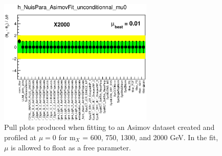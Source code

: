 \begin{figure}[hb]
\begin{center}
  \includegraphics[height=60mm]{figures/statFit_appendix/pullPlot_X2000_mu0_unconditional.eps}
  \caption{Pull plots produced when fitting to an Asimov dataset created and profiled at $\mu=0$ for m$_X$ = 600, 750, 1300, and 2000 GeV. In the fit, $\mu$ is allowed to float as a free parameter.}
  \label{fig:pullPlots_mu_uncond}
\end{center}    
\end{figure}


